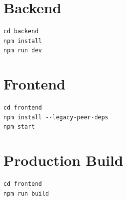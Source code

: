 \documentclass[12pt,a4paper]{report}
\begin{document}
\section{Backend}
\begin{lstlisting}
cd backend
npm install
npm run dev
\end{lstlisting}

\section{Frontend}
\begin{lstlisting}
cd frontend
npm install --legacy-peer-deps
npm start
\end{lstlisting}

\section{Production Build}
\begin{lstlisting}
cd frontend
npm run build
\end{lstlisting}
\end{document}
